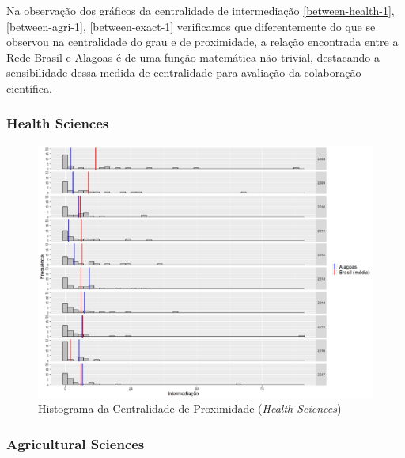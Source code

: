 Na observação dos gráficos da centralidade de intermediação \ref{between-health-1}, \ref{between-agri-1}, \ref{between-exact-1} verificamos que diferentemente do que se observou na centralidade do grau e de proximidade, a relação encontrada entre a Rede Brasil e Alagoas é de uma função matemática não trivial, destacando a sensibilidade dessa medida de centralidade para avaliação da colaboração científica. 


\subsubsection{Health Sciences}

\begin{figure}[H]
	\centering
	\includegraphics[scale=0.5]{Imagens/betweeness-hist.pdf}
	\caption{Histograma da Centralidade de Proximidade (\textit{Health Sciences})}
       \label{hist-health-between-1}
\end{figure}

\subsubsection{Agricultural Sciences}

